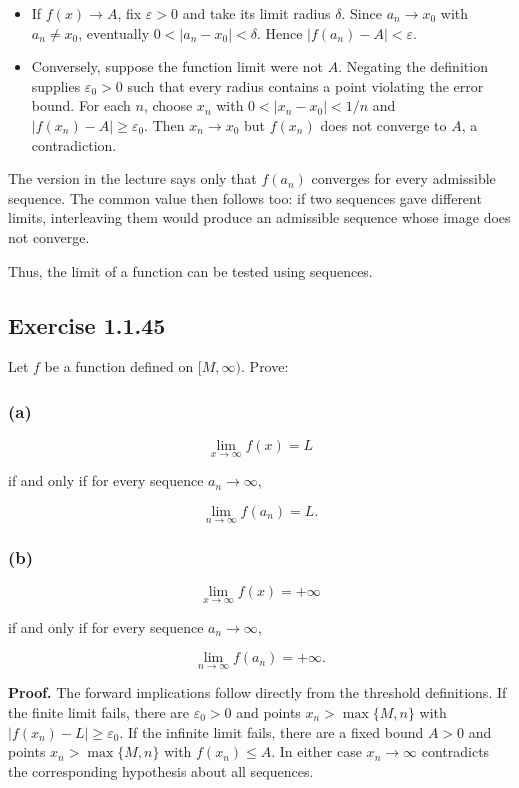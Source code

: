 \documentclass[11pt,a4paper]{article}
\begin{document}
\begin{itemize}
\item
  If \(f(x)\to A\), fix \(\varepsilon>0\) and take its limit radius
  \(\delta\). Since \(a_n\to x_0\) with \(a_n\ne x_0\), eventually
  \(0<|a_n-x_0|<\delta\). Hence \(|f(a_n)-A|<\varepsilon\).
\item
  Conversely, suppose the function limit were not \(A\). Negating the
  definition supplies \(\varepsilon_0>0\) such that every radius
  contains a point violating the error bound. For each \(n\), choose
  \(x_n\) with \(0<|x_n-x_0|<1/n\) and \(|f(x_n)-A|\ge\varepsilon_0\).
  Then \(x_n\to x_0\) but \(f(x_n)\) does not converge to \(A\), a
  contradiction.
\end{itemize}

The version in the lecture says only that \(f(a_n)\) converges for every
admissible sequence. The common value then follows too: if two sequences
gave different limits, interleaving them would produce an admissible
sequence whose image does not converge.

Thus, the limit of a function can be tested using sequences.

\subsection{Exercise 1.1.45}\label{exercise-1.1.45}

Let \(f\) be a function defined on \([M,\infty)\). Prove:

\subsubsection{(a)}\label{a-3}

\[
\lim_{x\to\infty}f(x)=L
\]

if and only if for every sequence \(a_n\to\infty\),

\[
\lim_{n\to\infty}f(a_n)=L.
\]

\subsubsection{(b)}\label{b-3}

\[
\lim_{x\to\infty}f(x)=+\infty
\]

if and only if for every sequence \(a_n\to\infty\),

\[
\lim_{n\to\infty}f(a_n)=+\infty.
\]

\textbf{Proof.} The forward implications follow directly from the
threshold definitions. If the finite limit fails, there are
\(\varepsilon_0>0\) and points \(x_n>\max\{M,n\}\) with
\(|f(x_n)-L|\ge\varepsilon_0\). If the infinite limit fails, there are a
fixed bound \(A>0\) and points \(x_n>\max\{M,n\}\) with \(f(x_n)\le A\).
In either case \(x_n\to\infty\) contradicts the corresponding hypothesis
about all sequences.
\end{document}
